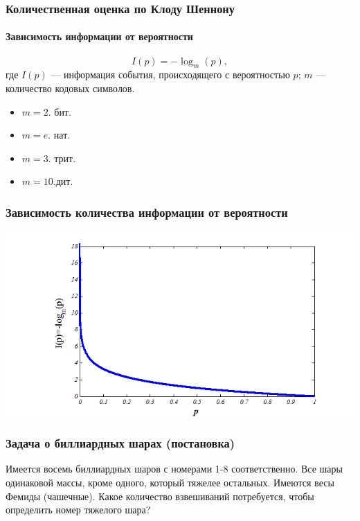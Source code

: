 \begin{frame}
    \frametitle{Количественная оценка по Клоду Шеннону}
    \framesubtitle{Зависимость информации от вероятности}
    
    \[
        I(p)=-\log_{m}(p),
    \]
    где $I(p)$ --- информация события, происходящего с вероятностью $p$; $m$ --- количество \alert{кодовых символов}.
    
    \begin{example}
        \begin{itemize}
            \item $m=2$. \alert{бит}.
            \item $m=e$. \alert{нат}.
            \item $m=3$. \alert{трит}.
            \item $m=10$.\alert{дит}.
        \end{itemize}    
    \end{example}
\end{frame}

\begin{frame}
    \frametitle{Зависимость количества информации от вероятности}
    
    \begin{center}
        \includegraphics[width=.8\textwidth]{fig/ip}
    \end{center} 
\end{frame}

\begin{frame}
    \frametitle{Задача о биллиардных шарах (постановка)}
    \begin{example}
        Имеется восемь биллиардных шаров с номерами 1-8 соответственно. Все шары одинаковой массы, кроме одного, который тяжелее остальных. Имеются весы Фемиды (чашечные). Какое количество взвешиваний потребуется, чтобы определить номер тяжелого шара?
    \end{example} 
\end{frame}

